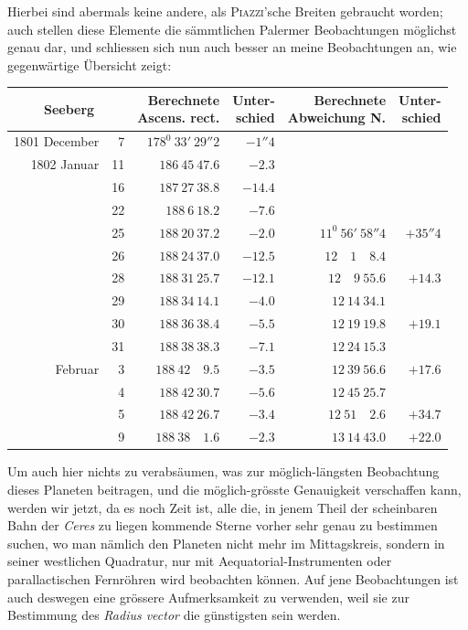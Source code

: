 Hierbei sind abermals keine andere, als \textsc{Piazzi}'sche Breiten gebraucht worden; auch stellen diese Elemente die sämmtlichen Palermer Beobachtungen möglichst genau dar, und schliessen sich nun auch besser an meine Beobachtungen an, wie gegenwärtige Übersicht zeigt:
\begin{center}
{\small\setlength{\tabcolsep}{4pt}
\begin{tabular}{r r|r|r|r|r}
\multicolumn{2}{c|}{Seeberg}&\shortstack{Berechnete\\Ascens. rect.}&\shortstack{Unter-\\schied}&\shortstack{Berechnete\\Abweichung N.}&\shortstack{Unter-\\schied}\\\hline
1801 December&7&$178^0\ 33'\ 29''2$&$-1''4$&&\\
1802 Januar&11&$186\ 45\ 47.6$&$-2.3$&&\\
&16&$187\ 27\ 38.8$&$-14.4$&&\\
&22&$188\ 6\ 18.2$&$-7.6$&&\\
&25&$188\ 20\ 37.2$&$-2.0$&$11^0\ 56'\ 58''4$&$+35''4$\\
&26&$188\ 24\ 37.0$&$-12.5$&$12\quad1\quad8.4$&\\
&28&$188\ 31\ 25.7$&$-12.1$&$12\quad9\ 55.6$&$+14.3$\\
&29&$188\ 34\ 14.1$&$-4.0$&$12\ 14\ 34.1$&\\
&30&$188\ 36\ 38.4$&$-5.5$&$12\ 19\ 19.8$&$+19.1$\\
&31&$188\ 38\ 38.3$&$-7.1$&$12\ 24\ 15.3$&\\
Februar&3&$188\ 42\quad9.5$&$-3.5$&$12\ 39\ 56.6$&$+17.6$\\
&4&$188\ 42\ 30.7$&$-5.6$&$12\ 45\ 25.7$&\\
&5&$188\ 42\ 26.7$&$-3.4$&$12\ 51\quad2.6$&$+34.7$\\
&9&$188\ 38\quad1.6$&$-2.3$&$13\ 14\ 43.0$&$+22.0$
\end{tabular}}
\end{center}
\expandafter\def\csname HistoricalNoteText18\endcsname{Um auch hier nichts zu verabsäumen, was zur möglich-längsten Beobachtung dieses Planeten beitragen, und die möglich-grösste Genauigkeit verschaffen kann, werden wir jetzt, da es noch Zeit ist, alle die, in jenem Theil der scheinbaren Bahn der \textit{Ceres} zu liegen kommende Sterne vorher sehr genau zu bestimmen suchen, wo man nämlich den Planeten nicht mehr im Mittagskreis, sondern in seiner westlichen Quadratur, nur mit Aequatorial-Instrumenten oder parallactischen Fernröhren wird beobachten können. Auf jene Beobachtungen ist auch deswegen eine grössere Aufmerksamkeit zu verwenden, weil sie zur Bestimmung des \textit{Radius vector} die günstigsten sein werden.}
